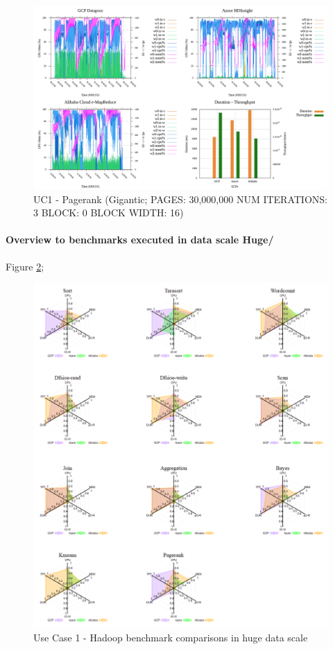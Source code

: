 \documentclass[review]{elsarticle}
\begin{document}
\begin{figure}[p]
	\includegraphics[width=\textwidth]{uc1-page-g-cmidt}
	\caption{UC1 - Pagerank (Gigantic; PAGES: 30,000,000 NUM ITERATIONS: 3 BLOCK: 0 BLOCK WIDTH: 16)}
	\label{fig:uc1-page-g-cmidt}
	\centering
\end{figure}




\paragraph{Overview to benchmarks executed in data scale Huge/} Figure \ref{fig:uc1-huge}; 

\begin{figure}[p]
	\includegraphics[width=\textwidth]{uc1-huge}
	\caption{Use Case 1 - Hadoop benchmark comparisons in huge data scale}
	\label{fig:uc1-huge}
	\centering
\end{figure}
\end{document}
